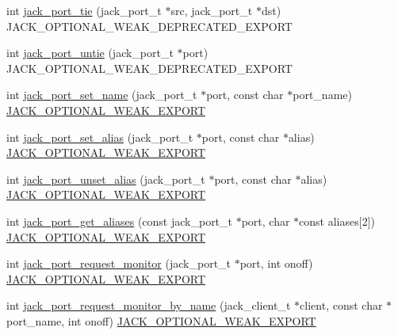 \begin{DoxyCompactItemize}
\item 
int \hyperlink{group__PortFunctions_ga14afcad849c17bcd6cb739d14899cecf}{jack\-\_\-port\-\_\-tie} (jack\-\_\-port\-\_\-t $\ast$src, jack\-\_\-port\-\_\-t $\ast$dst) \-J\-A\-C\-K\-\_\-\-O\-P\-T\-I\-O\-N\-A\-L\-\_\-\-W\-E\-A\-K\-\_\-\-D\-E\-P\-R\-E\-C\-A\-T\-E\-D\-\_\-\-E\-X\-P\-O\-R\-T
\item 
int \hyperlink{group__PortFunctions_gaab2cfe13d90991fbf1d03a2050b93f54}{jack\-\_\-port\-\_\-untie} (jack\-\_\-port\-\_\-t $\ast$port) \-J\-A\-C\-K\-\_\-\-O\-P\-T\-I\-O\-N\-A\-L\-\_\-\-W\-E\-A\-K\-\_\-\-D\-E\-P\-R\-E\-C\-A\-T\-E\-D\-\_\-\-E\-X\-P\-O\-R\-T
\item 
int \hyperlink{group__PortFunctions_ga9d335578836fd76d4a922403efaedc5c}{jack\-\_\-port\-\_\-set\-\_\-name} (jack\-\_\-port\-\_\-t $\ast$port, const char $\ast$port\-\_\-name) \hyperlink{weakmacros_8h_adf1bde0dd996bbf61a44311165014dd1}{\-J\-A\-C\-K\-\_\-\-O\-P\-T\-I\-O\-N\-A\-L\-\_\-\-W\-E\-A\-K\-\_\-\-E\-X\-P\-O\-R\-T}
\item 
int \hyperlink{group__PortFunctions_gae76a201e7a6dfe3af6ee78b99a055117}{jack\-\_\-port\-\_\-set\-\_\-alias} (jack\-\_\-port\-\_\-t $\ast$port, const char $\ast$alias) \hyperlink{weakmacros_8h_adf1bde0dd996bbf61a44311165014dd1}{\-J\-A\-C\-K\-\_\-\-O\-P\-T\-I\-O\-N\-A\-L\-\_\-\-W\-E\-A\-K\-\_\-\-E\-X\-P\-O\-R\-T}
\item 
int \hyperlink{group__PortFunctions_ga51af66966211d2a81a749ab2f689872d}{jack\-\_\-port\-\_\-unset\-\_\-alias} (jack\-\_\-port\-\_\-t $\ast$port, const char $\ast$alias) \hyperlink{weakmacros_8h_adf1bde0dd996bbf61a44311165014dd1}{\-J\-A\-C\-K\-\_\-\-O\-P\-T\-I\-O\-N\-A\-L\-\_\-\-W\-E\-A\-K\-\_\-\-E\-X\-P\-O\-R\-T}
\item 
int \hyperlink{group__PortFunctions_ga3fcae6e043fdb3ac87b173ff4cbf88d9}{jack\-\_\-port\-\_\-get\-\_\-aliases} (const jack\-\_\-port\-\_\-t $\ast$port, char $\ast$const aliases\mbox{[}2\mbox{]}) \hyperlink{weakmacros_8h_adf1bde0dd996bbf61a44311165014dd1}{\-J\-A\-C\-K\-\_\-\-O\-P\-T\-I\-O\-N\-A\-L\-\_\-\-W\-E\-A\-K\-\_\-\-E\-X\-P\-O\-R\-T}
\item 
int \hyperlink{group__PortFunctions_gab30737dde8a3168a575863de35ed5895}{jack\-\_\-port\-\_\-request\-\_\-monitor} (jack\-\_\-port\-\_\-t $\ast$port, int onoff) \hyperlink{weakmacros_8h_adf1bde0dd996bbf61a44311165014dd1}{\-J\-A\-C\-K\-\_\-\-O\-P\-T\-I\-O\-N\-A\-L\-\_\-\-W\-E\-A\-K\-\_\-\-E\-X\-P\-O\-R\-T}
\item 
int \hyperlink{group__PortFunctions_ga5fd1725d66427287abbec29fbae9214b}{jack\-\_\-port\-\_\-request\-\_\-monitor\-\_\-by\-\_\-name} (jack\-\_\-client\-\_\-t $\ast$client, const char $\ast$port\-\_\-name, int onoff) \hyperlink{weakmacros_8h_adf1bde0dd996bbf61a44311165014dd1}{\-J\-A\-C\-K\-\_\-\-O\-P\-T\-I\-O\-N\-A\-L\-\_\-\-W\-E\-A\-K\-\_\-\-E\-X\-P\-O\-R\-T}

\end{DoxyCompactItemize}
